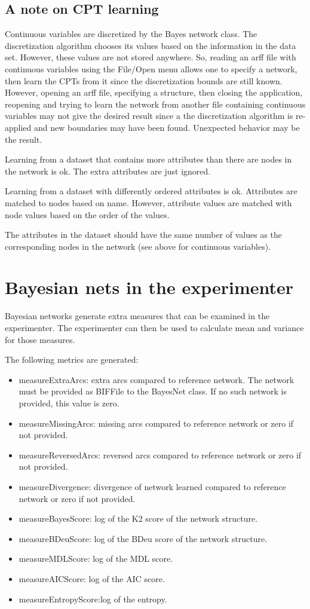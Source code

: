 \documentclass[a4paper]{article}
\begin{document}
\subsection*{A note on CPT learning}

Continuous variables are discretized by the Bayes network class.
The discretization algorithm chooses its values based on the information
in the data set. However, these values are not stored anywhere. So,
reading an arff file with continuous variables using the File/Open menu
allows one to specify a network, then learn the CPTs from it since the
discretization bounds are still known. However, opening an arff file, specifying
a structure, then closing the application, reopening and trying to learn the
network from another file containing continuous variables may not give the
desired result since a the discretization algorithm is re-applied and new
boundaries may have been found. Unexpected behavior may be the result.

Learning from a dataset that contains more attributes than there are nodes
in the network is ok. The extra attributes are just ignored.

Learning from a dataset with differently ordered attributes is ok. Attributes
are matched to nodes based on name. However, attribute values are matched
with node values based on the order of the values.

The attributes in the dataset should have the same number of values as the
corresponding nodes in the network (see above for continuous variables).

\section{Bayesian nets in the experimenter}

Bayesian networks generate extra measures that can be examined in the experimenter.
The experimenter can then be used to calculate mean and variance for those measures.

The following metrics are generated:
\begin{itemize}
\item measureExtraArcs: extra arcs compared to reference network. The network must be
provided as BIFFile to the BayesNet class. If no such network is provided, this value is zero.
\item measureMissingArcs: missing arcs compared to reference network or zero if not provided.
\item measureReversedArcs: reversed arcs compared to reference network or zero if not provided.
\item measureDivergence: divergence of network learned compared to reference network or zero if not provided.
\item measureBayesScore: log of the K2 score of the network structure.
\item measureBDeuScore: log of the BDeu score of the network structure.
\item measureMDLScore: log of the MDL score.
\item measureAICScore: log of the AIC score.
\item measureEntropyScore:log of the entropy.
\end{itemize}
\end{document}
